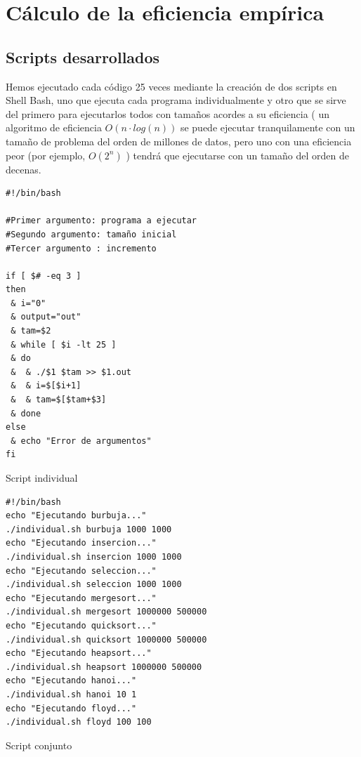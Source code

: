 \documentclass[12pt,spanish]{article}
\begin{document}
\section{Cálculo de la eficiencia empírica}
\subsection{Scripts desarrollados}
Hemos ejecutado cada código 25 veces mediante la creación de dos scripts en Shell Bash, uno que ejecuta cada programa individualmente y otro que se sirve del primero para ejecutarlos todos con tamaños acordes a su eficiencia ( un algoritmo de eficiencia $O(n \cdot log(n))$ se puede ejecutar tranquilamente con un tamaño de problema del orden de millones de datos, pero uno con una eficiencia peor (por ejemplo, $O(2^n)$ ) tendrá que ejecutarse con un tamaño del orden de decenas.
\begin{listing}[H]
\begin{verbatim}
#!/bin/bash

#Primer argumento: programa a ejecutar
#Segundo argumento: tamaño inicial
#Tercer argumento : incremento

if [ $# -eq 3 ]
then
 & i="0"
 & output="out"
 & tam=$2
 & while [ $i -lt 25 ]
 & do
 &  & ./$1 $tam >> $1.out
 &  & i=$[$i+1]
 &  & tam=$[$tam+$3]
 & done
else
 & echo "Error de argumentos"
fi
\end{verbatim}
\caption{Script individual}
\end{listing}
\newpage

\begin{listing}[H]
\begin{verbatim}
#!/bin/bash
echo "Ejecutando burbuja..."
./individual.sh burbuja 1000 1000
echo "Ejecutando insercion..."
./individual.sh insercion 1000 1000
echo "Ejecutando seleccion..."
./individual.sh seleccion 1000 1000
echo "Ejecutando mergesort..."
./individual.sh mergesort 1000000 500000
echo "Ejecutando quicksort..."
./individual.sh quicksort 1000000 500000
echo "Ejecutando heapsort..."
./individual.sh heapsort 1000000 500000
echo "Ejecutando hanoi..."
./individual.sh hanoi 10 1
echo "Ejecutando floyd..."
./individual.sh floyd 100 100
\end{verbatim}
\caption{Script conjunto}
\end{listing}
\end{document}
